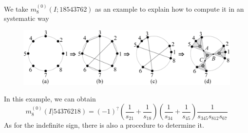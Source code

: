 \documentclass{beamer}
\begin{document}
\begin{frame}
    We take $m_8^{(0)}(I;18543762)$ as an example to explain how to compute it in an systematic way
    
    \begin{figure}
        \centering
        \includegraphics[width=1\linewidth]{7.png}
    \end{figure}
    In this example, we can obtain 
    \begin{equation*}
        m_8^{(0)}(I|54376218)=(-1)^?\left(\frac{1}{s_{21}}+\frac{1}{s_{18}}\right)\left(\frac{1}{s_{34}}+\frac{1}{s_{45}}\right)\frac{1}{s_{345}s_{812}s_{67}}
    \end{equation*}
    As for the indefinite sign, there is also a procedure to determine it.
    
\end{frame}
    
\end{document}
